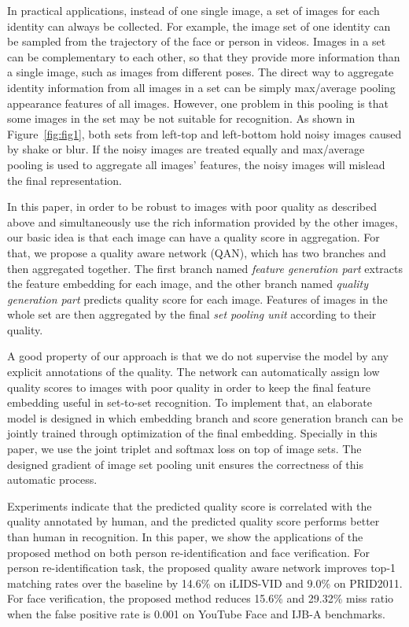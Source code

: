 In practical applications, instead of one single image, a set of images for each identity can always be collected. For example, the image set of one identity can be sampled from the trajectory of the face or person in videos. Images in a set can be complementary to each other, so that they provide more information than a single image, such as images from different poses. The direct way to aggregate identity information from all images in a set can be simply max/average pooling appearance features of all images. However, one problem in this pooling is that some images in the set may be not suitable for recognition. As shown in Figure~\ref{fig:fig1}, both sets from left-top and left-bottom hold noisy images caused by shake or blur. If the noisy images are treated equally and max/average pooling is used to aggregate all images' features, the noisy images will mislead the final representation.

In this paper, in order to be robust to images with poor quality as described above and simultaneously use the rich information provided by the other images, our basic idea is that each image can have a quality score in aggregation. For that, we propose a quality aware network (QAN), which has two branches and then aggregated together. The first branch named \emph{feature generation part} extracts the feature embedding for each image, and the other branch named \emph{quality generation part} predicts quality score for each image. Features of images in the whole set are then aggregated by the final \emph{set pooling unit} according to their quality. 

A good property of our approach is that we do not supervise the  model by any explicit annotations of the quality. The network can automatically assign low quality scores to images with poor quality in order to keep the final feature embedding useful in set-to-set recognition. To implement that, an elaborate model is designed in which embedding branch and score generation branch can be jointly trained through optimization of the final embedding.  Specially in this paper, we use the joint triplet and softmax loss on top of image sets. The designed gradient of image set pooling unit ensures the correctness of this automatic process. 

Experiments indicate that the predicted quality score is correlated with the quality annotated by human, and the predicted quality score performs better than human in recognition. In this paper, we show the applications of the proposed method on both person re-identification and face verification. For person re-identification task, the proposed quality aware network improves top-1 matching rates over the baseline by 14.6\% on iLIDS-VID  and 9.0\% on PRID2011. For face verification, the proposed method reduces 15.6\% and 29.32\% miss ratio  when the false positive rate is 0.001 on YouTube Face and IJB-A benchmarks.

